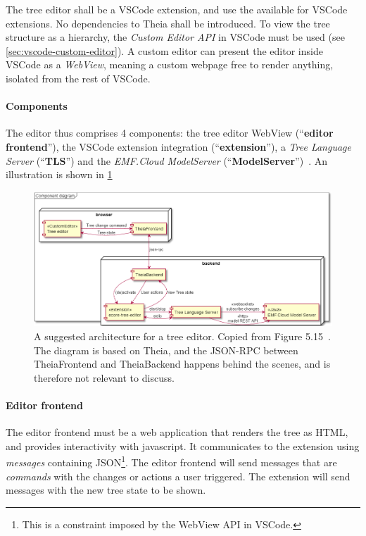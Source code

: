 The tree editor shall be a \gls{VSCode} extension, and use the available  for \gls{VSCode} extensions.
No dependencies to \gls{Theia} shall be introduced.
To view the tree structure as a hierarchy, the \textit{Custom Editor API} in \gls{VSCode} must be used (see \cref{sec:vscode-custom-editor}).
A custom editor can present the editor inside \gls{VSCode} as a \textit{WebView}, meaning a custom webpage free to render anything, isolated from the rest of \gls{VSCode}.


\paragraph{Components}
The editor thus comprises 4 components: the tree editor WebView (``\textbf{editor frontend}''), the \gls{VSCode} extension integration (``\textbf{extension}''), a \textit{Tree Language Server} (``\textbf{TLS}'') and the \textit{EMF.Cloud ModelServer} (``\textbf{ModelServer}'')~\cite[p.~48,49]{rekstadModelingEnvironmentCloud2020}.
An illustration is shown in \cref{fig:pre-project-tree-editor-architecture}

\begin{figure}[htbp]
  \centering
  \includegraphics[width=\textwidth]{figures/pre-project/tree-editor-component-diagram.png}
  \caption[Tree Editor Architecture]{A suggested architecture for a tree editor. Copied from Figure 5.15~\cite[p.~49]{rekstadModelingEnvironmentCloud2020}. The diagram is based on \gls{Theia}, and the \gls{JSON-RPC} between TheiaFrontend and TheiaBackend happens behind the scenes, and is therefore not relevant to discuss.}\label{fig:pre-project-tree-editor-architecture}
\end{figure}


\paragraph{Editor frontend}
The editor frontend must be a web application that renders the tree as HTML, and provides interactivity with javascript. 
It communicates to the extension using \textit{messages} containing \gls{JSON}\footnote{This is a constraint imposed by the WebView API in VSCode.}.
The editor frontend will send messages that are \textit{commands} with the changes or actions a user triggered.
The extension will send messages with the new tree state to be shown.

